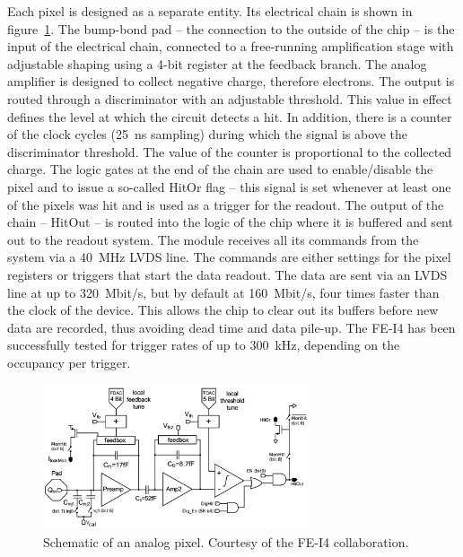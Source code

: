 Each pixel is designed as a separate entity. Its electrical chain is shown in figure~\ref{fig:anapix}. The bump-bond pad -- the connection to the outside of the chip -- is the input of the electrical chain, connected to a free-running amplification stage with adjustable shaping using a 4-bit register at the feedback branch. The analog amplifier is designed to collect negative charge, therefore electrons. The output is routed through a discriminator with an adjustable threshold. This value in effect defines the level at which the circuit detects a hit. In addition, there is a counter of the clock cycles (25~ns sampling) during which the signal is above the discriminator threshold. The value of the counter is proportional to the collected charge. The logic gates at the end of the chain are used to enable/disable the pixel and to issue a so-called HitOr flag -- this signal is set whenever at least one of the pixels was hit and is used as a trigger for the readout. The output of the chain -- HitOut -- is routed into the logic of the chip where it is buffered and sent out to the readout system. The module receives all its commands from the system via a 40~MHz LVDS line. The commands are either settings for the pixel registers or triggers that start the data readout. The data are sent via an LVDS line at up to 320~Mbit/s, but by default at 160~Mbit/s, four times faster than the clock of the device. This allows the chip to clear out its buffers before new data are recorded, thus avoiding dead time and data pile-up. The FE-I4 has been successfully tested for trigger rates of up to 300~kHz, depending on the occupancy per trigger. 

\begin{figure}[!t]
\centering
\includegraphics[width=0.7\textwidth]{04_charge_monitoring/pics/analogPix}
\caption{Schematic of an analog pixel. Courtesy of the FE-I4 collaboration.}
\label{fig:anapix}
\end{figure}

